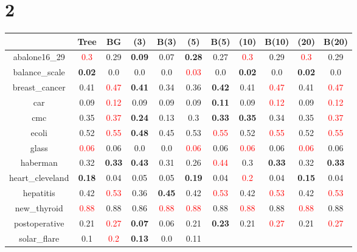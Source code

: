 \documentclass{article}%
\begin{document}
\section*{2}%
\begin{tabular}{c|cccccccccc}%
\hline%
&Tree&BG&(3)&B(3)&(5)&B(5)&(10)&B(10)&(20)&B(20)\\%
\hline%
abalone16\_29&\textcolor{red}{ 
0.3
}&0.29&\textbf{0.09}&0.07&\textbf{0.28}&0.27&\textcolor{red}{ 
0.3
}&0.29&\textcolor{red}{ 
0.3
}&0.29\\%
\hline%
balance\_scale&\textbf{0.02}&0.0&0.0&0.0&\textcolor{red}{ 
0.03
}&0.0&\textbf{0.02}&0.0&\textbf{0.02}&0.0\\%
\hline%
breast\_cancer&0.41&\textcolor{red}{ 
0.47
}&\textbf{0.41}&0.34&0.36&\textbf{0.42}&0.41&\textcolor{red}{ 
0.47
}&0.41&\textcolor{red}{ 
0.47
}\\%
\hline%
car&0.09&\textcolor{red}{ 
0.12
}&0.09&0.09&0.09&\textbf{0.11}&0.09&\textcolor{red}{ 
0.12
}&0.09&\textcolor{red}{ 
0.12
}\\%
\hline%
cmc&0.35&\textcolor{red}{ 
0.37
}&\textbf{0.24}&0.13&0.3&\textbf{0.33}&\textbf{0.35}&0.34&0.35&\textcolor{red}{ 
0.37
}\\%
\hline%
ecoli&0.52&\textcolor{red}{ 
0.55
}&\textbf{0.48}&0.45&0.53&\textcolor{red}{ 
0.55
}&0.52&\textcolor{red}{ 
0.55
}&0.52&\textcolor{red}{ 
0.55
}\\%
\hline%
glass&\textcolor{red}{ 
0.06
}&0.06&0.0&0.0&\textcolor{red}{ 
0.06
}&0.06&\textcolor{red}{ 
0.06
}&0.06&\textcolor{red}{ 
0.06
}&0.06\\%
\hline%
haberman&0.32&\textbf{0.33}&\textbf{0.43}&0.31&0.26&\textcolor{red}{ 
0.44
}&0.3&\textbf{0.33}&0.32&\textbf{0.33}\\%
\hline%
heart\_cleveland&\textbf{0.18}&0.04&0.05&0.05&\textbf{0.19}&0.04&\textcolor{red}{ 
0.2
}&0.04&\textbf{0.15}&0.04\\%
\hline%
hepatitis&0.42&\textcolor{red}{ 
0.53
}&0.36&\textbf{0.45}&0.42&\textcolor{red}{ 
0.53
}&0.42&\textcolor{red}{ 
0.53
}&0.42&\textcolor{red}{ 
0.53
}\\%
\hline%
new\_thyroid&\textcolor{red}{ 
0.88
}&0.88&0.86&\textcolor{red}{ 
0.88
}&\textcolor{red}{ 
0.88
}&0.88&\textcolor{red}{ 
0.88
}&0.88&\textcolor{red}{ 
0.88
}&0.88\\%
\hline%
postoperative&0.21&\textcolor{red}{ 
0.27
}&\textbf{0.07}&0.06&0.21&\textbf{0.23}&0.21&\textcolor{red}{ 
0.27
}&0.21&\textcolor{red}{ 
0.27
}\\%
\hline%
solar\_flare&0.1&\textcolor{red}{ 
0.2
}&\textbf{0.13}&0.0&0.11&\textcolor{red}{ 
}
\end{tabular}
\end{document}
